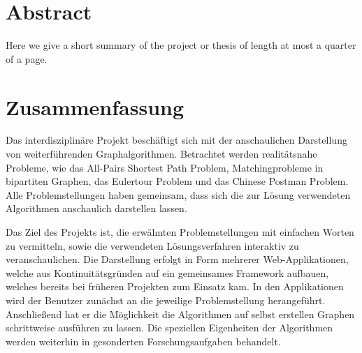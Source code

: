 \cleardoublepage

\section*{Abstract}
Here we give a short summary of the project or thesis of length at most a quarter of a page.


\section*{Zusammenfassung}
Das interdisziplinäre Projekt beschäftigt sich mit der anschaulichen Darstellung von weiterführenden Graphalgorithmen. Betrachtet werden realitätsnahe Probleme, wie das All-Pairs Shortest Path Problem, Matchingprobleme in bipartiten Graphen, das Eulertour Problem und das Chinese Postman Problem. Alle Problemstellungen haben gemeinsam, dass sich die zur Lösung verwendeten Algorithmen anschaulich darstellen lassen.

Das Ziel des Projekts ist, die erwähnten Problemstellungen mit einfachen Worten zu vermitteln, sowie die verwendeten Lösungsverfahren interaktiv zu veranschaulichen. Die Darstellung erfolgt in Form mehrerer Web-Applikationen, welche aus Kontinuitätsgründen auf ein gemeinsames Framework aufbauen, welches bereits bei früheren Projekten zum Einsatz kam. In den Applikationen wird der Benutzer zunächst an die jeweilige Problemstellung herangeführt. Anschließend hat er die Möglichkeit die Algorithmen auf selbst erstellen Graphen schrittweise ausführen zu lassen. Die speziellen Eigenheiten der Algorithmen werden weiterhin in gesonderten Forschungsaufgaben behandelt. 


